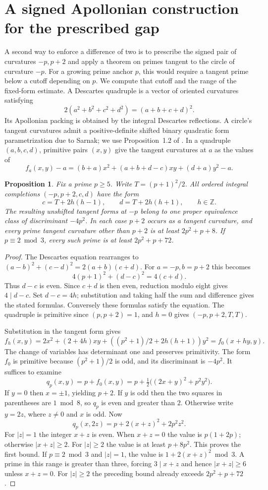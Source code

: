 \documentclass[11pt]{article}
\newtheorem{proposition}{Proposition}
\begin{document}
\section{A signed Apollonian construction for the prescribed gap}
A second way to enforce a difference of two is to prescribe the
signed pair of curvatures $-p,p+2$ and apply a theorem on primes
tangent to the circle of curvature $-p$. For a growing prime anchor
$p$, this would require a tangent prime below a cutoff depending on
$p$. We compute that cutoff and the range of the fixed-form estimate.
A Descartes quadruple is a vector of oriented curvatures satisfying
\[
 2(a^2+b^2+c^2+d^2)=(a+b+c+d)^2 .
\]
Its Apollonian packing is obtained by the integral Descartes
reflections. A circle's tangent curvatures admit a positive-definite
shifted binary quadratic form parametrization due to Sarnak; we use
Proposition~1.2 of \cite{FHRS}. In a quadruple $(a,b,c,d)$, primitive
pairs $(x,y)$ give the tangent curvatures at $a$ as the values of
\[
 f_a(x,y)-a=(b+a)x^2+(a+b+d-c)xy+(d+a)y^2-a .
\]

\begin{proposition}
Fix a prime $p\ge5$. Write $T=(p+1)^2/2$.
All ordered integral completions $(-p,p+2,c,d)$ have the form
\[
             c=T+2h(h-1),\qquad d=T+2h(h+1),\qquad h\in\mathbb Z .
\]
The resulting unshifted tangent forms at $-p$ belong to one proper
equivalence class of discriminant $-4p^2$. In each case $p+2$ occurs
as a tangent curvature, and every prime tangent curvature other than
$p+2$ is at least $2p^2+p+8$.
If $p\equiv2\bmod3$, every such prime is at least $2p^2+p+72$.
\end{proposition}
\begin{proof}
The Descartes equation rearranges to
$(a-b)^2+(c-d)^2=2(a+b)(c+d)$.
For $a=-p,b=p+2$ this becomes
\[
              4(p+1)^2+(d-c)^2=4(c+d).
\]
Thus $d-c$ is even. Since $c+d$ is then even, reduction modulo eight
gives $4\mid d-c$. Set $d-c=4h$; substitution and taking half the sum
and difference gives the stated formulas. Conversely these formulas
satisfy the equation. The quadruple is primitive since $(p,p+2)=1$,
and $h=0$ gives $(-p,p+2,T,T)$.

Substitution in the tangent form gives
\[
 f_h(x,y)=2x^2+(2+4h)xy+
 \left((p^2+1)/2+2h(h+1)\right)y^2=f_0(x+hy,y).
\]
The change of variables has determinant one and preserves primitivity.
The form $f_0$ is primitive because $(p^2+1)/2$ is odd, and its
discriminant is $-4p^2$. It suffices to examine
\[
 q_p(x,y)=p+f_0(x,y)=p+\tfrac12\bigl((2x+y)^2+p^2y^2\bigr).
\]
If $y=0$ then $x=\pm1$, yielding $p+2$. If $y$ is odd then the
two squares in parentheses are $1\bmod8$, so $q_p$ is even and
greater than $2$. Otherwise write $y=2z$, where $z\ne0$ and $x$ is
odd. Now
\[
 q_p(x,2z)=p+2(x+z)^2+2p^2z^2.
\]
For $|z|=1$ the integer $x+z$ is even. When $x+z=0$ the value is
$p(1+2p)$; otherwise $|x+z|\ge2$. For $|z|\ge2$ the value is at
least $p+8p^2$. This proves the first bound. If $p\equiv2\bmod3$
and $|z|=1$, the value is $1+2(x+z)^2\bmod3$. A prime in this
range is greater than three, forcing $3\mid x+z$ and hence
$|x+z|\ge6$ unless $x+z=0$. For $|z|\ge2$ the preceding bound
already exceeds $2p^2+p+72$.
\end{proof}
\end{document}
